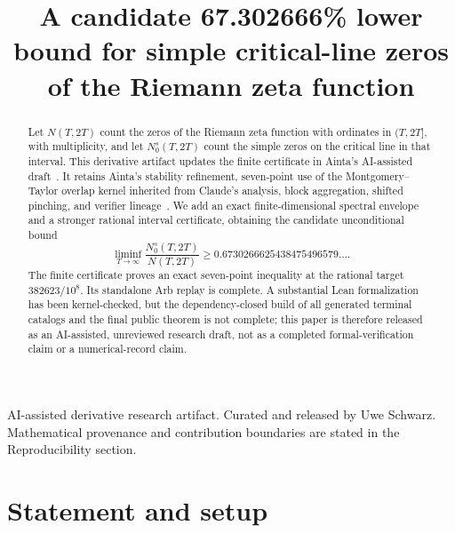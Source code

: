 \documentclass[11pt]{article}
\title{A candidate 67.302666\% lower bound for simple critical-line zeros of the Riemann zeta function}
\date{}
\begin{document}
\maketitle

\begin{center}
\small
AI-assisted derivative research artifact. Curated and released by Uwe Schwarz.
Mathematical provenance and contribution boundaries are stated in the
Reproducibility section.
\end{center}

\begin{abstract}
Let $N(T,2T)$ count the zeros of the Riemann zeta function with ordinates in
$(T,2T]$, with multiplicity, and let $N_0^s(T,2T)$ count the simple zeros on
the critical line in that interval.  This derivative artifact updates the
finite certificate in Ainta's AI-assisted draft~\cite{Ainta26}.  It retains
Ainta's stability refinement, seven-point use of the Montgomery--Taylor
overlap kernel inherited from Claude's analysis, block aggregation, shifted
pinching, and verifier lineage~\cite{Claude26}.  We add an exact
finite-dimensional spectral envelope and a stronger rational interval
certificate, obtaining the candidate unconditional bound
\[
 \liminf_{T\to\infty}\frac{N_0^s(T,2T)}{N(T,2T)}
 \ge 0.6730266625438475496579\ldots .
\]
The finite certificate proves an exact seven-point inequality at the rational
target $382623/10^8$.  Its standalone Arb replay is complete.  A substantial
Lean formalization has been kernel-checked, but the dependency-closed build of
all generated terminal catalogs and the final public theorem is not complete;
this paper is therefore released as an AI-assisted, unreviewed research draft,
not as a completed formal-verification claim or a numerical-record claim.
\end{abstract}

\clearpage
\section{Statement and setup}
\end{document}
